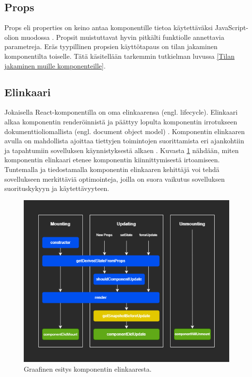 
\subsection{Props}
\label{Props}

Props eli properties on keino antaa komponentille tietoa käytettäväksi JavaScript-olion muodossa \cite{reactdocscomponents}. Propsit muistuttavat hyvin pitkälti funktiolle annettavia parametreja. Eräs tyypillinen propsien käyttötapaus on tilan jakaminen komponentilta toiselle. Tätä käsitellään tarkemmin tutkielman luvussa \ref{Tilan jakaminen muille komponenteille}. 


\subsection{Elinkaari}
\label{Elinkaari}

Jokaisella React-komponentilla on oma elinkaarensa (engl. lifecycle). Elinkaari alkaa komponentin renderöinnistä ja päättyy lopulta komponentin irrotukseen dokumenttioliomallista (engl. document object model) \cite{reactdocsstate}. Komponentin elinkaaren avulla on mahdollista ajoittaa tiettyjen toimintojen suorittamista eri ajankohtiin ja tapahtumiin sovelluksen käynnistyksestä alkaen \cite{reactdocsstate}. Kuvasta \ref{fig:lifecycle} nähdään, miten komponentin elinkaari etenee komponentin kiinnittymisestä irtoamiseen. Tuntemalla ja tiedostamalla komponentin elinkaaren kehittäjä voi tehdä sovellukseen merkittäviä optimointeja, joilla on suora vaikutus sovelluksen suorituskykyyn ja käytettävyyteen. 
\begin{figure}[h]
\centering \includegraphics[width=1\textwidth]{kuvat/Elinkaari.png}
\caption{Graafinen esitys komponentin elinkaaresta.}
\label{fig:lifecycle} 
\end{figure}

